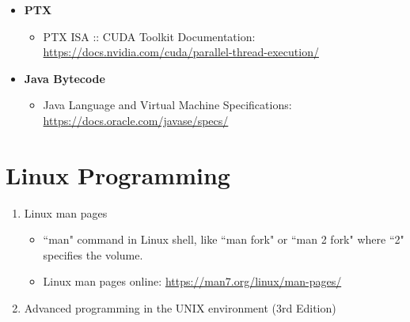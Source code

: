 \documentclass{article}
\begin{document}
\begin{itemize}
    \item \textbf{PTX}
    \begin{itemize}
        \item PTX ISA :: CUDA Toolkit Documentation:\\
        \href{https://docs.nvidia.com/cuda/parallel-thread-execution/}{https://docs.nvidia.com/cuda/parallel-thread-execution/}
    \end{itemize}
    \item \textbf{Java Bytecode}
    \begin{itemize}
        \item Java Language and Virtual Machine Specifications:\\
    \href{https://docs.oracle.com/javase/specs/}{https://docs.oracle.com/javase/specs/}
    \end{itemize}
\end{itemize}

\section{Linux Programming}
\begin{enumerate}
    \item Linux man pages
    \begin{itemize}
        \item ``man" command in Linux shell, like ``man fork" or ``man 2 fork" where ``2" specifies the volume.
        \item Linux man pages online:
        \href{https://man7.org/linux/man-pages/}{https://man7.org/linux/man-pages/}
    \end{itemize}
    \item Advanced programming in the UNIX environment (3rd Edition) \cite{stevens1992advanced}
\end{enumerate}
\end{document}
